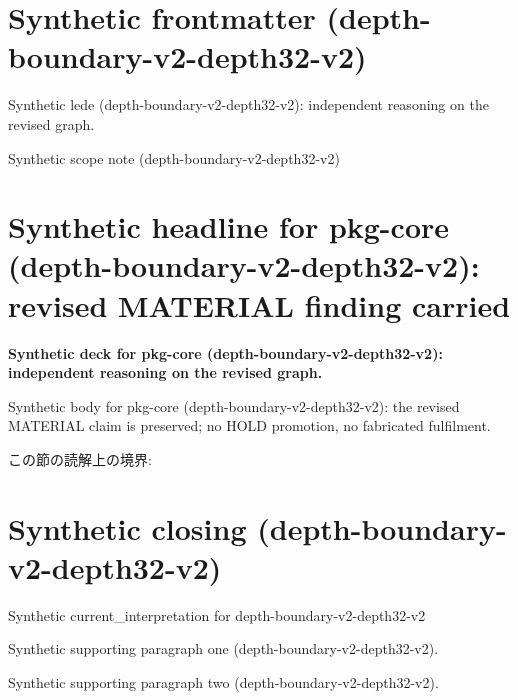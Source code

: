 \documentclass[lualatex,a4paper,10pt]{jlreq}
\begin{document}
\surveycover
\clearpage
\section*{Synthetic frontmatter (depth-boundary-v2-depth32-v2)}
Synthetic lede (depth-boundary-v2-depth32-v2): independent reasoning on the revised graph.

\begin{claimboundary}
\noindent Synthetic scope note (depth-boundary-v2-depth32-v2)\par
\end{claimboundary}
\clearpage
\twocolumn
\section{Synthetic headline for pkg-core (depth-boundary-v2-depth32-v2): revised MATERIAL finding carried}
\label{pkg:pkg-core}
\noindent\textbf{Synthetic deck for pkg-core (depth-boundary-v2-depth32-v2): independent reasoning on the revised graph.} \cite{w2026-W33target-source}\par\medskip
\noindent Synthetic body for pkg-core (depth-boundary-v2-depth32-v2): the revised MATERIAL claim is preserved; no HOLD promotion, no fabricated fulfilment.\par\medskip
\begin{claimboundary}
この節の読解上の境界: 
\end{claimboundary}
\clearpage
\onecolumn
\section{Synthetic closing (depth-boundary-v2-depth32-v2)}
\label{sec:issue-summary}
\noindent Synthetic current\_interpretation for depth-boundary-v2-depth32-v2\par\medskip
\noindent Synthetic supporting paragraph one (depth-boundary-v2-depth32-v2).\par\medskip
\noindent Synthetic supporting paragraph two (depth-boundary-v2-depth32-v2).\par\medskip
\clearpage
\onecolumn
\printbibliography[title={References / Source Notes}]
\end{document}
